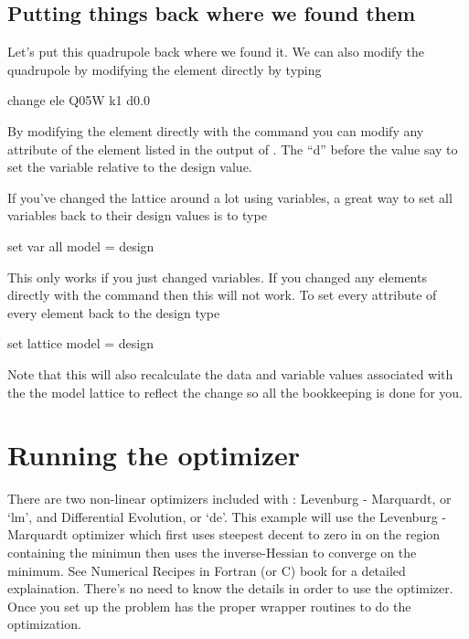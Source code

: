 \documentclass{report}
\begin{document}
\section{Putting things back where we found them}
\label{s:put_it_back}

Let's put this quadrupole back where we found it. We can also modify the quadrupole
by modifying the element directly by typing
\begin{example}
  change ele Q05W k1 d0.0
\end{example}
By modifying the element directly with the  command you can
modify any attribute of the element listed in the output of .
The ``d'' before the value say to set the variable relative to the design value.

If you've changed the lattice around a lot using variables, a great way to set
all variables back to their design values is to type
\begin{example}
  set var all model = design
\end{example}
This only works if you just changed variables. If you changed any elements
directly with the  command then this will not work. To set
every attribute of every element back to the design type
\begin{example}
  set lattice model = design
\end{example}
Note that this will also recalculate the data and variable values associated with the
the model lattice to reflect the change so all the bookkeeping is done for you.


\chapter{Running the optimizer}
\label{c:optimizer}

There are two non-linear optimizers included with \tao: Levenburg - Marquardt,
or `lm', and
Differential Evolution, or `de'. This example will use the 
Levenburg - Marquardt optimizer which first uses steepest decent to zero in on
the region containing the minimun then uses the inverse-Hessian to converge on
the minimum. See Numerical Recipes in Fortran (or C) book for a detailed
explaination. There's no need to know the details in order to use the
optimizer. Once you set up the problem \tao has the proper wrapper routines to
do the optimization.
\end{document}
